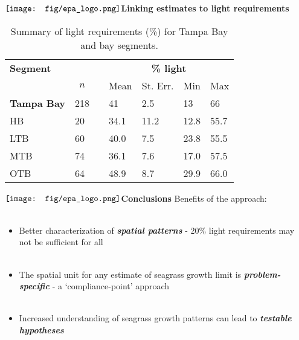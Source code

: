 \documentclass[serif]{beamer}\usepackage[]{graphicx}\usepackage[]{color}
\newcommand{\emtxt}[1]{\textbf{\textit{{\color{mypal4} #1}}}}
\begin{document}
\begin{frame}{$\vcenter{\hbox{\texttt{[image: fig/epa\_logo.png]}}}$\hspace{0.07in}\textbf{Linking estimates to light requirements}}
\begin{table}[!tbp]
\end{table}
\begin{table}[!tbp]
\caption{Summary of light requirements (\%) for Tampa Bay and bay segments.\label{tablt}} 
\begin{center}
\begin{tabular}{llcllll}
\hline\hline
\multicolumn{1}{l}{\bfseries Segment}&\multicolumn{1}{c}{\bfseries }&\multicolumn{1}{c}{\bfseries }&\multicolumn{4}{c}{\bfseries {\bf \% light}}\tabularnewline
\cline{4-7}
\multicolumn{1}{l}{}&\multicolumn{1}{c}{$n$}&\multicolumn{1}{c}{}&\multicolumn{1}{c}{Mean}&\multicolumn{1}{c}{St. Err.}&\multicolumn{1}{c}{Min}&\multicolumn{1}{c}{Max}\tabularnewline
\hline
\textbf{Tampa Bay}&218&&41\textsuperscript{}&2.5&13&66\tabularnewline
\hspace{0.02in} HB&20&&34.1&11.2&12.8&55.7\tabularnewline
\hspace{0.02in} LTB&60&&40.0& 7.5&23.8&55.5\tabularnewline
\hspace{0.02in} MTB&74&&36.1& 7.6&17.0&57.5\tabularnewline
\hspace{0.02in} OTB&64&&48.9& 8.7&29.9&66.0\tabularnewline
\hline
\end{tabular}\end{center}

\end{table}

\end{frame}

\begin{frame}{$\vcenter{\hbox{\texttt{[image: fig/epa\_logo.png]}}}$\hspace{0.07in}\textbf{Conclusions}}
Benefits of the approach: \\~\\
\begin{itemize}
\item Better characterization of \emtxt{spatial patterns} - 20\% light requirements may not be sufficient for all \\~\\
\item The spatial unit for any estimate of seagrass growth limit is \emtxt{problem-specific} - a `compliance-point' approach \\~\\
\item Increased understanding of seagrass growth patterns can lead to \emtxt{testable hypotheses}
\end{itemize}
\vspace{0.07in}
\centerline{}
\end{frame}
\end{document}
